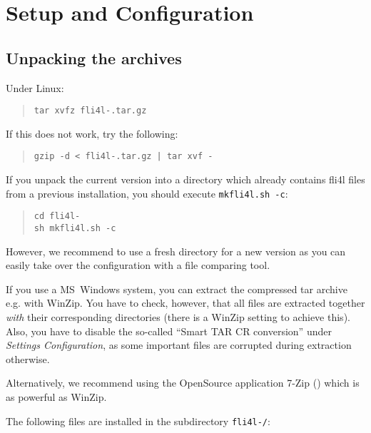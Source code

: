 
\chapter{Setup and Configuration}

\section{Unpacking the archives}

Under Linux:

\begin{verse}\texttt{tar xvfz fli4l-\version.tar.gz}\end{verse}

\noindent If this does not work, try the following:

\begin{verse}\texttt{gzip -d < fli4l-\version.tar.gz | tar xvf -}\end{verse}

If you unpack the current version into a directory which already contains fli4l
files from a previous installation, you should execute \texttt{mkfli4l.sh -c}:

\begin{verse}
    \texttt{cd fli4l-\version}\\
    \texttt{sh mkfli4l.sh -c}
\end{verse}

However, we recommend to use a fresh directory for a new version as you can
easily take over the configuration with a file comparing tool.

If you use a MS~Windows system, you can extract the compressed tar archive e.g.
with WinZip. You have to check, however, that all files are extracted together
\emph{with} their corresponding directories (there is a WinZip setting to
achieve this). Also, you have to disable the so-called ``Smart TAR CR
conversion''  under \emph{Settings \pfeil Configuration}, as some
important files are corrupted during extraction otherwise.

Alternatively, we recommend using the OpenSource application 7-Zip
() which is as powerful as WinZip.

The following files are installed in the subdirectory \texttt{fli4l-\version/}:


